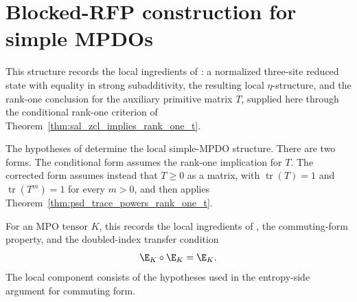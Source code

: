 \section{Blocked-RFP construction for simple MPDOs}

\begin{definition}
    \label{def:simple_mpdo_local_structure_data}
    \leanok
    This structure records the local ingredients of
    \cite[Appendix~C.2]{Cirac2016MPDO_arXiv}: a normalized
    three-site reduced state with equality in strong subadditivity, the
    resulting local $\eta$-structure, and the rank-one conclusion for the
    auxiliary primitive matrix $T$, supplied here through the conditional
    rank-one criterion of Theorem~\ref{thm:sal_zcl_implies_rank_one_t}.
\end{definition}

\begin{theorem}
    \label{thm:simple_mpdo_local_structure_data_of_sal_zcl}
    \leanok
    The hypotheses of \cite[Lemmas~C.2, C.4, and~C.5]{Cirac2016MPDO_arXiv}
    determine the local simple-MPDO
    structure. There are two forms. The conditional form assumes the
    rank-one implication for $T$. The corrected form assumes instead that
    $T\ge 0$ as a matrix, with $\operatorname{tr}(T)=1$ and
    $\operatorname{tr}(T^m)=1$ for every $m>0$, and then applies
    Theorem~\ref{thm:psd_trace_powers_rank_one_t}.
\end{theorem}

\begin{definition}
    \label{def:simple_mpdo_blocked_rfp_data}
    \leanok
    For an MPO tensor $K$, this records the local ingredients of
    \cite[Appendix~C.2]{Cirac2016MPDO_arXiv}, the commuting-form property,
    and the doubled-index transfer condition
    \[
        \E_K\circ\E_K=\E_K.
    \]
    The local component consists of the hypotheses used in the entropy-side
    argument for commuting form.
\end{definition}

